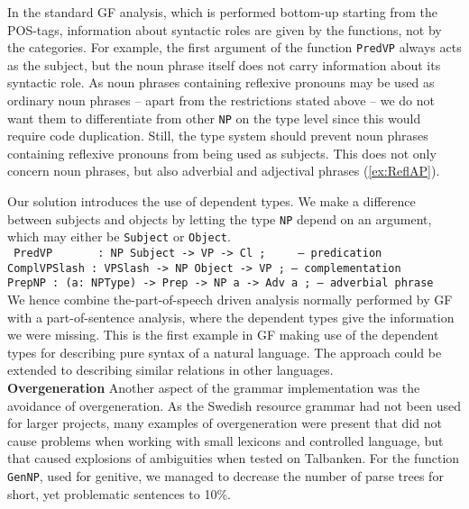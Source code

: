 \documentclass[runningheads,a4paper]{llncs}
\begin{document}
In the standard GF analysis, which is performed bottom-up starting from the
POS-tags, information about syntactic roles are given by the functions, not by the
categories. For example, the first argument of the function 
\verb-PredVP- always acts as the subject, but the noun phrase itself does not carry
information about its syntactic role.
As noun phrases containing reflexive pronouns may be used as ordinary
noun phrases -- apart from the restrictions stated above --
we do not want them to differentiate
from other \verb-NP- on the type level since this would require code duplication.
Still, the type system should prevent noun phrases containing reflexive
pronouns from being used as subjects.
This does not only concern noun phrases, but also adverbial and adjectival phrases 
(\ref{ex:ReflAP}).

Our solution introduces the use of dependent types.
We make a difference between subjects and objects
by letting the type \verb-NP- depend on an argument, 
which may either be \verb-Subject- or \verb-Object-.\\
\small \texttt{
\indent PredVP  ~~~~~ : NP Subject -> VP        -> Cl ; ~~~ -- predication\\
\indent ComplVPSlash : VPSlash    -> NP Object -> VP ; -- complementation\\
\indent PrepNP       : (a: NPType) -> Prep -> NP a -> Adv a ; -- adverbial phrase \\
}
\normalsize
We hence combine the-part-of-speech driven analysis normally performed by
GF with a part-of-sentence analysis, where the dependent types give the 
information we were missing.
This is the first example in GF making use of the dependent types for 
describing pure syntax of a natural language. The approach could be extended
to describing similar relations
in other languages.\\

\noindent \textbf{Overgeneration}
Another aspect of the grammar implementation was the avoidance of overgeneration. As
the Swedish resource grammar had not been used for larger projects, many examples of
overgeneration were present that did not cause problems when working with small
lexicons and controlled language, but that caused explosions of ambiguities when 
tested on Talbanken. For the function \verb-GenNP-, used for genitive, we managed
to decrease the number of parse trees for short, yet problematic sentences to 10\%.
\end{document}
